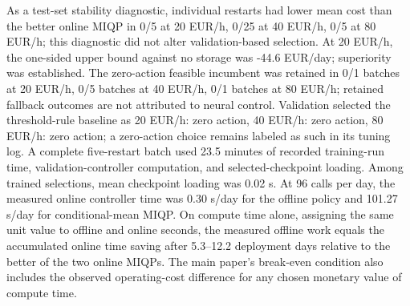 As a test-set stability diagnostic, individual restarts had lower mean cost than the better online MIQP in 0/5 at 20 EUR/h, 0/25 at 40 EUR/h, 0/5 at 80 EUR/h; this diagnostic did not alter validation-based selection.
At 20 EUR/h, the one-sided upper bound against no storage was -44.6 EUR/day; superiority was established.
The zero-action feasible incumbent was retained in 0/1 batches at 20 EUR/h, 0/5 batches at 40 EUR/h, 0/1 batches at 80 EUR/h; retained fallback outcomes are not attributed to neural control.
Validation selected the threshold-rule baseline as 20 EUR/h: zero action, 40 EUR/h: zero action, 80 EUR/h: zero action; a zero-action choice remains labeled as such in its tuning log.
A complete five-restart batch used 23.5 minutes of recorded training-run time, validation-controller computation, and selected-checkpoint loading. Among trained selections, mean checkpoint loading was 0.02 s. At 96 calls per day, the measured online controller time was 0.30 s/day for the offline policy and 101.27 s/day for conditional-mean MIQP.
On compute time alone, assigning the same unit value to offline and online seconds, the measured offline work equals the accumulated online time saving after 5.3--12.2 deployment days relative to the better of the two online MIQPs. The main paper's break-even condition also includes the observed operating-cost difference for any chosen monetary value of compute time.
